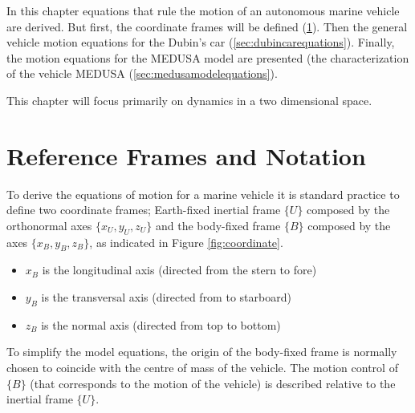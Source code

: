 \cleardoublepage
\label{chap:autonomousvehiclemodels}

\par In this chapter equations that rule the motion of an autonomous marine vehicle are derived. But first, the coordinate frames will be defined (\ref{sec:refframes}). Then the general vehicle motion equations for the Dubin's car (\ref{sec:dubincarequations}). Finally, the motion equations for the MEDUSA model are presented (the characterization of the vehicle MEDUSA (\ref{sec:medusamodelequations}). 
\par This chapter will focus primarily on dynamics in a two dimensional space.

\section{Reference Frames and Notation}
\label{sec:refframes}


\par To derive the equations of motion for a marine vehicle it is standard practice to define two coordinate frames; Earth-fixed inertial frame $\{U\}$ composed by the orthonormal axes $\{x_U,y_U,z_U\}$ and the body-fixed frame $\{B\}$ composed by the axes $\{x_B,y_B,z_B\}$, as indicated in Figure \ref{fig:coordinate}.

\begin{itemize}
    \item $x_B$ is the longitudinal axis (directed from the stern to fore)
    \item $y_B$ is the transversal axis (directed from to starboard)
    \item $z_B$ is the normal axis (directed from top to bottom)
\end{itemize}

\par To simplify the model equations, the origin of the body-fixed frame is normally chosen to coincide with the centre of mass of the vehicle. The motion control of $\{B\}$ (that corresponds to the motion of the vehicle) is described relative to the inertial frame $\{U\}$.

